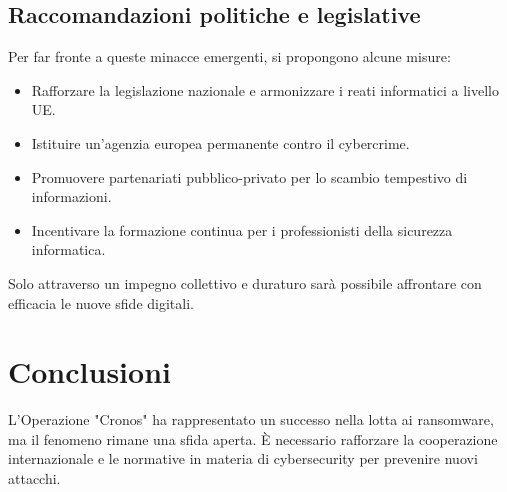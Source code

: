 \documentclass[a4paper,12pt]{article}
\begin{document}
\subsection{Raccomandazioni politiche e legislative}
Per far fronte a queste minacce emergenti, si propongono alcune misure:
\begin{itemize}
    \item Rafforzare la legislazione nazionale e armonizzare i reati informatici a livello UE.
    \item Istituire un’agenzia europea permanente contro il cybercrime.
    \item Promuovere partenariati pubblico-privato per lo scambio tempestivo di informazioni.
    \item Incentivare la formazione continua per i professionisti della sicurezza informatica.
\end{itemize}
Solo attraverso un impegno collettivo e duraturo sarà possibile affrontare con efficacia le nuove sfide digitali.

\section{Conclusioni}
L'Operazione "Cronos" ha rappresentato un successo nella lotta ai ransomware, ma il fenomeno rimane una sfida aperta. È necessario rafforzare la cooperazione internazionale e le normative in materia di cybersecurity per prevenire nuovi attacchi.

\newpage
\end{document}
